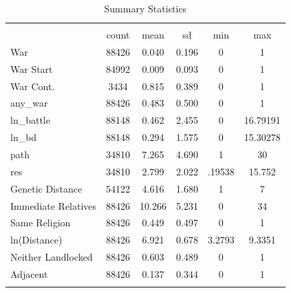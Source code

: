 \documentclass{article}
\begin{document}
\begin{table}[htbp]\centering
\def\sym#1{\ifmmode^{#1}\else\(^{#1}\)\fi}
\caption{Summary Statistics \label{SummStats}}
\begin{tabular}{l*{1}{ccccc}}
\toprule
                    &\multicolumn{5}{c}{}                                            \\
                    &       count&        mean&          sd&         min&         max\\
\midrule
War                 &       88426&       0.040&       0.196&           0&           1\\
War Start           &       84992&       0.009&       0.093&           0&           1\\
War Cont.           &        3434&       0.815&       0.389&           0&           1\\
any\_war             &       88426&       0.483&       0.500&           0&           1\\
ln\_battle           &       88148&       0.462&       2.455&           0&    16.79191\\
ln\_bd               &       88148&       0.294&       1.575&           0&    15.30278\\
path                &       34810&       7.265&       4.690&           1&          30\\
res                 &       34810&       2.799&       2.022&      .19538&      15.752\\
Genetic Distance    &       54122&       4.616&       1.680&           1&           7\\
Immediate Relatives &       88426&      10.266&       5.231&           0&          34\\
Same Religion       &       88426&       0.449&       0.497&           0&           1\\
ln(Distance)        &       88426&       6.921&       0.678&      3.2793&      9.3351\\
Neither Landlocked  &       88426&       0.603&       0.489&           0&           1\\
Adjacent            &       88426&       0.137&       0.344&           0&           1\\
\bottomrule
\multicolumn{6}{l}{\footnotesize \addtocounter{table}{1}}\\
\end{tabular}
\end{table}
\end{document}
